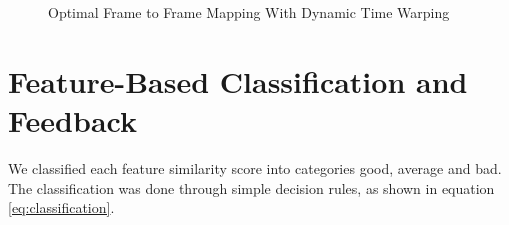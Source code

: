 \begin{figure} 
  \centering
 \quad 
  \caption{Optimal Frame to Frame Mapping With Dynamic Time Warping} 
  \label{fig:optimalAlignment}
\end{figure}

\section{Feature-Based Classification and Feedback}
\label{section:classificationAndFeedback}

We classified each feature similarity score into categories good, average and bad. The classification was done through simple decision rules, as shown in equation \ref{eq:classification}.

